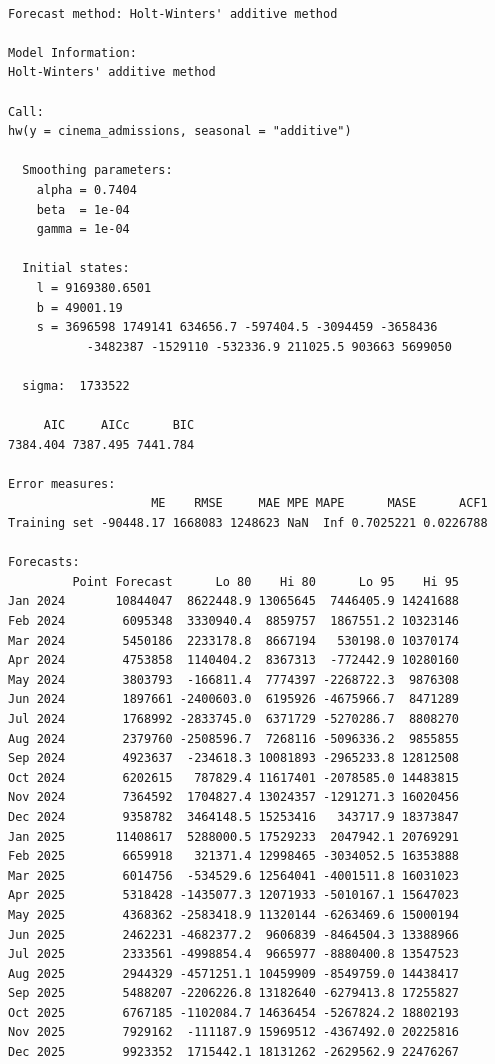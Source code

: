 \documentclass[
]{article}
\begin{document}
\begin{verbatim}

Forecast method: Holt-Winters' additive method

Model Information:
Holt-Winters' additive method 

Call:
hw(y = cinema_admissions, seasonal = "additive")

  Smoothing parameters:
    alpha = 0.7404 
    beta  = 1e-04 
    gamma = 1e-04 

  Initial states:
    l = 9169380.6501 
    b = 49001.19 
    s = 3696598 1749141 634656.7 -597404.5 -3094459 -3658436
           -3482387 -1529110 -532336.9 211025.5 903663 5699050

  sigma:  1733522

     AIC     AICc      BIC 
7384.404 7387.495 7441.784 

Error measures:
                    ME    RMSE     MAE MPE MAPE      MASE      ACF1
Training set -90448.17 1668083 1248623 NaN  Inf 0.7025221 0.0226788

Forecasts:
         Point Forecast      Lo 80    Hi 80      Lo 95    Hi 95
Jan 2024       10844047  8622448.9 13065645  7446405.9 14241688
Feb 2024        6095348  3330940.4  8859757  1867551.2 10323146
Mar 2024        5450186  2233178.8  8667194   530198.0 10370174
Apr 2024        4753858  1140404.2  8367313  -772442.9 10280160
May 2024        3803793  -166811.4  7774397 -2268722.3  9876308
Jun 2024        1897661 -2400603.0  6195926 -4675966.7  8471289
Jul 2024        1768992 -2833745.0  6371729 -5270286.7  8808270
Aug 2024        2379760 -2508596.7  7268116 -5096336.2  9855855
Sep 2024        4923637  -234618.3 10081893 -2965233.8 12812508
Oct 2024        6202615   787829.4 11617401 -2078585.0 14483815
Nov 2024        7364592  1704827.4 13024357 -1291271.3 16020456
Dec 2024        9358782  3464148.5 15253416   343717.9 18373847
Jan 2025       11408617  5288000.5 17529233  2047942.1 20769291
Feb 2025        6659918   321371.4 12998465 -3034052.5 16353888
Mar 2025        6014756  -534529.6 12564041 -4001511.8 16031023
Apr 2025        5318428 -1435077.3 12071933 -5010167.1 15647023
May 2025        4368362 -2583418.9 11320144 -6263469.6 15000194
Jun 2025        2462231 -4682377.2  9606839 -8464504.3 13388966
Jul 2025        2333561 -4998854.4  9665977 -8880400.8 13547523
Aug 2025        2944329 -4571251.1 10459909 -8549759.0 14438417
Sep 2025        5488207 -2206226.8 13182640 -6279413.8 17255827
Oct 2025        6767185 -1102084.7 14636454 -5267824.2 18802193
Nov 2025        7929162  -111187.9 15969512 -4367492.0 20225816
Dec 2025        9923352  1715442.1 18131262 -2629562.9 22476267
\end{verbatim}
\end{document}
